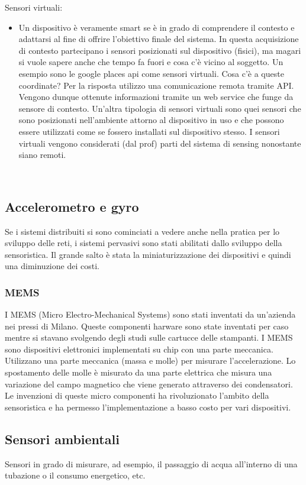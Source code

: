 Sensori virtuali:
\begin{itemize}
    \item Un dispositivo è veramente smart se è in grado di comprendere il contesto e adattarsi al fine di offrire l'obiettivo finale del sistema. In questa acquisizione di contesto partecipano i sensori posizionati sul dispositivo (fisici), ma magari si vuole sapere anche che tempo fa fuori e cosa c'è vicino al soggetto. Un esempio sono le google places api come sensori virtuali. Cosa c'è a queste coordinate? Per la risposta utilizzo una comunicazione remota tramite API. Vengono dunque ottenute informazioni tramite un web service che funge da sensore di contesto. Un'altra tipologia di sensori virtuali sono quei sensori che sono posizionati nell'ambiente attorno al dispositivo in uso e che possono essere utilizzati come se fossero installati sul dispositivo stesso. I sensori virtuali vengono considerati (dal prof) parti del sistema di sensing nonostante siano remoti.
\end{itemize}

\phantom\\

\subsection{Accelerometro e gyro}
Se i sistemi distribuiti si sono cominciati a vedere anche nella pratica per lo sviluppo delle reti, i sistemi pervasivi sono stati abilitati dallo sviluppo della sensoristica.
Il grande salto è stata la miniaturizzazione dei dispositivi e quindi una diminuzione dei costi.
\subsubsection{MEMS}
I MEMS (Micro Electro-Mechanical Systems) sono stati inventati da un'azienda nei pressi di Milano. Queste componenti harware sono state inventati per caso mentre si stavano svolgendo degli studi sulle cartucce delle stampanti. 
I MEMS sono dispositivi elettronici implementati su chip con una parte meccanica. 
Utilizzano una parte meccanica (massa e molle) per misurare l'accelerazione. Lo spostamento delle molle è misurato da una parte elettrica che misura una variazione del campo magnetico che viene generato attraverso dei condensatori. Le invenzioni di queste micro componenti ha rivoluzionato l'ambito della sensoristica e ha permesso l'implementazione a basso costo per vari dispositivi.

\subsection{Sensori ambientali}
Sensori in grado di misurare, ad esempio, il passaggio di acqua all'interno di una tubazione o il consumo energetico, etc.

